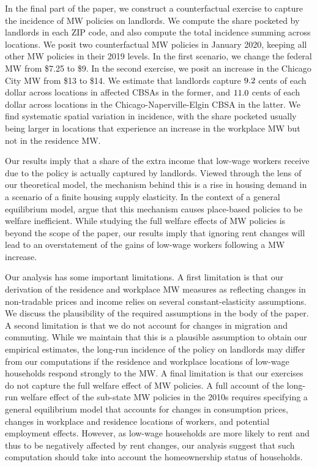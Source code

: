 
In the final part of the paper, we construct a counterfactual exercise to 
capture the incidence of MW policies on landlords.
We compute the share pocketed by landlords in each ZIP code, and also
compute the total incidence summing across locations.
We posit two counterfactual MW policies in January 2020, keeping all other
MW policies in their 2019 levels.
In the first scenario, we change the federal MW from \$7.25 to \$9.
In the second exercise, we posit an increase in the Chicago City MW 
from \$13 to \$14.
We estimate that landlords capture $\textnormal{9.2}$ cents of each 
dollar across locations in affected CBSAs in the former, and 
$\textnormal{11.0}$ cents of each dollar across locations in the 
Chicago-Naperville-Elgin CBSA in the latter.
We find systematic spatial variation in incidence,
with the share pocketed usually being larger in locations that experience an
increase in the workplace MW but not in the residence MW.

Our results imply that a share of the extra income that low-wage workers
receive due to the policy is actually captured by landlords.
Viewed through the lens of our theoretical model,
the mechanism behind this is a rise in housing demand in a scenario of a 
finite housing supply elasticity.
In the context of a general equilibrium model, \textcite{KlineMoretti2014} argue
that this mechanism causes place-based policies to be welfare inefficient.
While studying the full welfare effects of MW policies is beyond the scope of 
the paper, our results imply that ignoring rent changes will lead to an 
overstatement of the gains of low-wage workers following a MW increase.

Our analysis has some important limitations.
A first limitation is that our derivation of the residence and workplace MW
measures as reflecting changes in non-tradable prices and income relies on 
several constant-elasticity assumptions.
We discuss the plausibility of the required assumptions in the body of the paper.
A second limitation is that we do not account for changes in migration and 
commuting.
While we maintain that this is a plausible assumption to obtain our empirical 
estimates, the long-run incidence of the policy on landlords may differ from our 
computations if the residence and workplace locations of low-wage households 
respond strongly to the MW.
A final limitation is that our exercises do not capture the full welfare 
effect of MW policies.
A full account of the long-run welfare effect of the sub-state MW policies in 
the 2010s requires specifying a general equilibrium model that accounts for 
changes in consumption prices, changes in workplace and residence locations
of workers, and potential employment effects.
However, as low-wage households are more likely to rent and thus to be 
negatively affected by rent changes, our analysis suggest that such computation 
should take into account the homeownership status of households.

